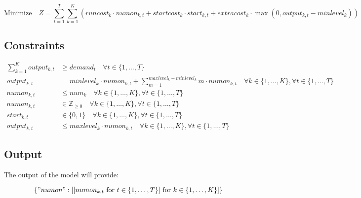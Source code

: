 \documentclass{article}
\begin{document}
\[
\text{Minimize} \quad Z = \sum_{t=1}^{T} \sum_{k=1}^{K} \left( runcost_k \cdot numon_{k,t} + startcost_k \cdot start_{k,t} + extracost_k \cdot \max(0, output_{k,t} - minlevel_k) \right)
\]

\subsection*{Constraints}
\begin{align}
    \sum_{k=1}^{K} output_{k,t} & \geq demand_t \quad \forall t \in \{1, \ldots, T\} \\
    output_{k,t} & = minlevel_k \cdot numon_{k,t} + \sum_{m=1}^{maxlevel_k - minlevel_k} m \cdot numon_{k,t} \quad \forall k \in \{1, \ldots, K\}, \forall t \in \{1, \ldots, T\} \\
    numon_{k,t} & \leq num_k \quad \forall k \in \{1, \ldots, K\}, \forall t \in \{1, \ldots, T\} \\
    numon_{k,t} & \in \mathbb{Z}_{\geq 0} \quad \forall k \in \{1, \ldots, K\}, \forall t \in \{1, \ldots, T\} \\
    start_{k,t} & \in \{0,1\} \quad \forall k \in \{1, \ldots, K\}, \forall t \in \{1, \ldots, T\} \\
    output_{k,t} & \leq maxlevel_k \cdot numon_{k,t} \quad \forall k \in \{1, \ldots, K\}, \forall t \in \{1, \ldots, T\}
\end{align}

\subsection*{Output}
The output of the model will provide:

\[
\{ "numon": [[numon_{k,t} \text{ for } t \in \{1,\ldots,T\}] \text{ for } k \in \{1,\ldots,K\}] \} 
\]
\end{document}
